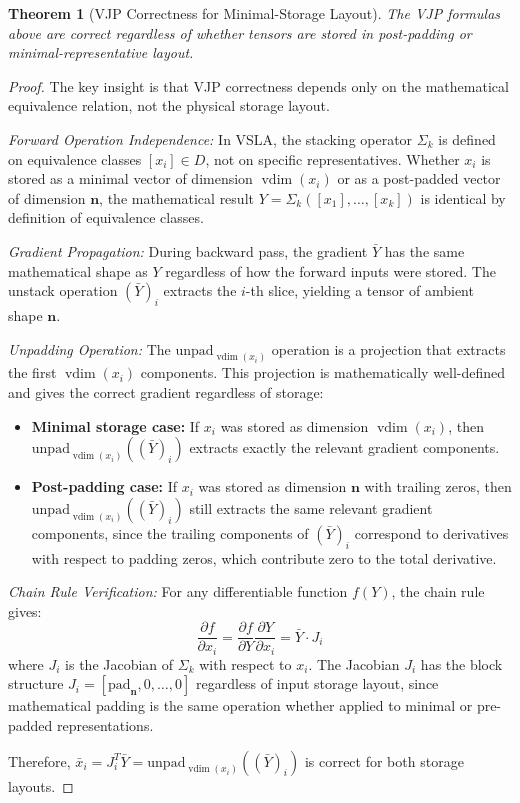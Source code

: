 \documentclass[11pt]{article}
\newtheorem{theorem}{Theorem}[section]
\newcommand{\vdim}{\operatorname{vdim}}
\begin{document}
\begin{theorem}[VJP Correctness for Minimal-Storage Layout]
The VJP formulas above are correct regardless of whether tensors are stored in post-padding or minimal-representative layout.
\end{theorem}
\begin{proof}
The key insight is that VJP correctness depends only on the mathematical equivalence relation, not the physical storage layout.

\textit{Forward Operation Independence:} In VSLA, the stacking operator $\Sigma_k$ is defined on equivalence classes $[x_i] \in D$, not on specific representatives. Whether $x_i$ is stored as a minimal vector of dimension $\vdim(x_i)$ or as a post-padded vector of dimension $\mathbf{n}$, the mathematical result $Y = \Sigma_k([x_1], \ldots, [x_k])$ is identical by definition of equivalence classes.

\textit{Gradient Propagation:} During backward pass, the gradient $\bar{Y}$ has the same mathematical shape as $Y$ regardless of how the forward inputs were stored. The unstack operation $(\bar{Y})_i$ extracts the $i$-th slice, yielding a tensor of ambient shape $\mathbf{n}$.

\textit{Unpadding Operation:} The $\text{unpad}_{\vdim(x_i)}$ operation is a projection that extracts the first $\vdim(x_i)$ components. This projection is mathematically well-defined and gives the correct gradient regardless of storage:
\begin{itemize}
\item \textbf{Minimal storage case:} If $x_i$ was stored as dimension $\vdim(x_i)$, then $\text{unpad}_{\vdim(x_i)}((\bar{Y})_i)$ extracts exactly the relevant gradient components.
\item \textbf{Post-padding case:} If $x_i$ was stored as dimension $\mathbf{n}$ with trailing zeros, then $\text{unpad}_{\vdim(x_i)}((\bar{Y})_i)$ still extracts the same relevant gradient components, since the trailing components of $(\bar{Y})_i$ correspond to derivatives with respect to padding zeros, which contribute zero to the total derivative.
\end{itemize}

\textit{Chain Rule Verification:} For any differentiable function $f(Y)$, the chain rule gives:
\[
\frac{\partial f}{\partial x_i} = \frac{\partial f}{\partial Y} \frac{\partial Y}{\partial x_i} = \bar{Y} \cdot J_i
\]
where $J_i$ is the Jacobian of $\Sigma_k$ with respect to $x_i$. The Jacobian $J_i$ has the block structure $J_i = [\text{pad}_{\mathbf{n}}, 0, \ldots, 0]$ regardless of input storage layout, since mathematical padding is the same operation whether applied to minimal or pre-padded representations.

Therefore, $\bar{x}_i = J_i^T \bar{Y} = \text{unpad}_{\vdim(x_i)}((\bar{Y})_i)$ is correct for both storage layouts.
\end{proof}
\end{document}
